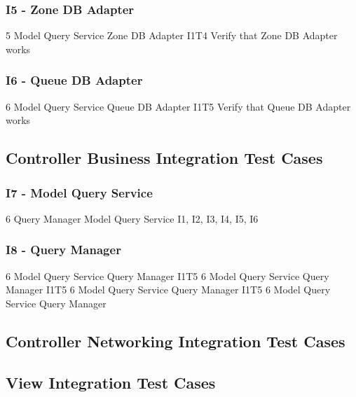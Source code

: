 \subsubsection{I5 - Zone DB Adapter}
\testCaseSimple
	{5}
	{Model Query Service}
	{Zone DB Adapter}
	{I1T4}
	{Verify that Zone DB Adapter works}
\subsubsection{I6 - Queue DB Adapter}
\testCaseSimple
	{6}
	{Model Query Service}
	{Queue DB Adapter}
	{I1T5}
	{Verify that Queue DB Adapter works}
	
\subsection{Controller Business Integration Test Cases}
\subsubsection{I7 - Model Query Service}
\testCaseSimple
{6}
{Query Manager}
{Model Query Service}
{I1, I2, I3, I4, I5, I6}
{}
\subsubsection{I8 - Query Manager}
\testCaseSimple
{6}
{Model Query Service}
{Query Manager}
{I1T5}
{}
\testCaseSimple
{6}
{Model Query Service}
{Query Manager}
{I1T5}
{}
\testCaseSimple
{6}
{Model Query Service}
{Query Manager}
{I1T5}
{}
\testCaseSimple
{6}
{Model Query Service}
{Query Manager}
{}
\subsection{Controller Networking Integration Test Cases}
\subsection{View Integration Test Cases}